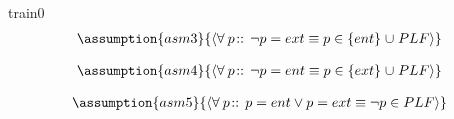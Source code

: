 \documentclass[12pt]{amsart}
\begin{document}
\begin{machine}{train0}
\begin{align*}\assumption{asm3}
{	\qforall{p}{}{ \neg p = ext \equiv p \in \{ent\} \bunion PLF }	}
\end{align*}

\begin{align*}\assumption{asm4}
{	\qforall{p}{}{ \neg p = ent \equiv p \in \{ext\} \bunion PLF }	}
\end{align*}

\begin{align*}\assumption{asm5}
{	\qforall{p}{}{ p = ent \lor p = ext \equiv \neg p \in PLF }	}
\end{align*}


\end{machine}
\end{document}
